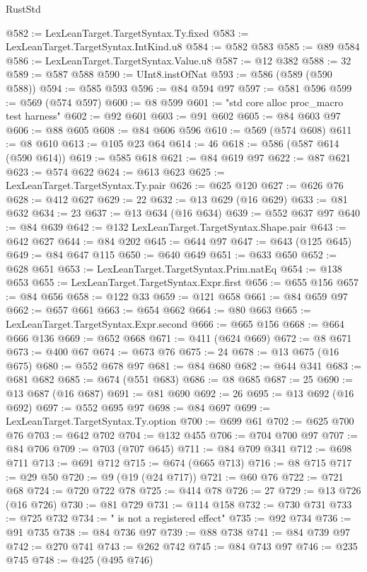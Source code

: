 \begin{lexlean}{RustStd}
\begin{coremodule}
{\begin{coremodule}
{{{{{{{{{{{{{{{{{{{{{{{{{{{{{{{{{{{{{{{{{{{{{{{{{{{{{@582 := LexLeanTarget.TargetSyntax.Ty.fixed
@583 := LexLeanTarget.TargetSyntax.IntKind.u8
@584 := @582 @583
@585 := @89 @584
@586 := LexLeanTarget.TargetSyntax.Value.u8
@587 := @12 @382
@588 := 32
@589 := @587 @588
@590 := UInt8.instOfNat
@593 := @586 (@589 (@590 @588))
@594 := @585 @593
@596 := @84 @594 @97
@597 := @581 @596
@599 := @569 (@574 @597)
@600 := @8 @599
@601 := "std core alloc proc_macro test harness"
@602 := @92 @601
@603 := @91 @602
@605 := @84 @603 @97
@606 := @88 @605
@608 := @84 @606 @596
@610 := @569 (@574 @608)
@611 := @8 @610
@613 := @105 @23 @64
@614 := 46
@618 := @586 (@587 @614 (@590 @614))
@619 := @585 @618
@621 := @84 @619 @97
@622 := @87 @621
@623 := @574 @622
@624 := @613 @623
@625 := LexLeanTarget.TargetSyntax.Ty.pair
@626 := @625 @120
@627 := @626 @76
@628 := @412 @627
@629 := 22
@632 := @13 @629 (@16 @629)
@633 := @81 @632
@634 := 23
@637 := @13 @634 (@16 @634)
@639 := @552 @637 @97
@640 := @84 @639
@642 := @132 LexLeanTarget.TargetSyntax.Shape.pair
@643 := @642 @627
@644 := @84 @202
@645 := @644 @97
@647 := @643 (@125 @645)
@649 := @84 @647 @115
@650 := @640 @649
@651 := @633 @650
@652 := @628 @651
@653 := LexLeanTarget.TargetSyntax.Prim.natEq
@654 := @138 @653
@655 := LexLeanTarget.TargetSyntax.Expr.first
@656 := @655 @156
@657 := @84 @656
@658 := @122 @33
@659 := @121 @658
@661 := @84 @659 @97
@662 := @657 @661
@663 := @654 @662
@664 := @80 @663
@665 := LexLeanTarget.TargetSyntax.Expr.second
@666 := @665 @156
@668 := @664 @666 @136
@669 := @652 @668
@671 := @411 (@624 @669)
@672 := @8 @671
@673 := @400 @67
@674 := @673 @76
@675 := 24
@678 := @13 @675 (@16 @675)
@680 := @552 @678 @97
@681 := @84 @680
@682 := @644 @341
@683 := @681 @682
@685 := @674 (@551 @683)
@686 := @8 @685
@687 := 25
@690 := @13 @687 (@16 @687)
@691 := @81 @690
@692 := 26
@695 := @13 @692 (@16 @692)
@697 := @552 @695 @97
@698 := @84 @697
@699 := LexLeanTarget.TargetSyntax.Ty.option
@700 := @699 @61
@702 := @625 @700 @76
@703 := @642 @702
@704 := @132 @455
@706 := @704 @700 @97
@707 := @84 @706
@709 := @703 (@707 @645)
@711 := @84 @709 @341
@712 := @698 @711
@713 := @691 @712
@715 := @674 (@665 @713)
@716 := @8 @715
@717 := @29 @50
@720 := @9 (@19 (@24 @717))
@721 := @60 @76
@722 := @721 @68
@724 := @720 @722 @78
@725 := @414 @78
@726 := 27
@729 := @13 @726 (@16 @726)
@730 := @81 @729
@731 := @114 @158
@732 := @730 @731
@733 := @725 @732
@734 := " is not a registered effect"
@735 := @92 @734
@736 := @91 @735
@738 := @84 @736 @97
@739 := @88 @738
@741 := @84 @739 @97
@742 := @270 @741
@743 := @262 @742
@745 := @84 @743 @97
@746 := @235 @745
@748 := @425 (@495 @746)
}}}}}}}}}}}}}}}}}}}}}}}}}}}}}}}}}}}}}}}}}}}}}}}}}}}}}
\end{coremodule}}
\end{coremodule}
\end{lexlean}
